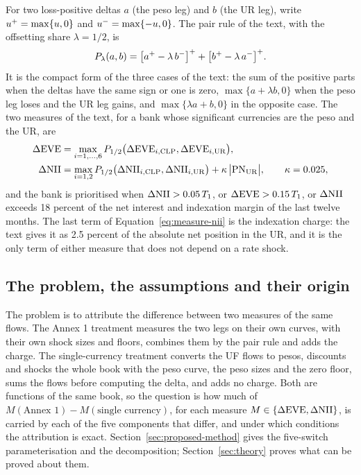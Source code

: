 For two loss-positive deltas $a$ (the peso leg) and $b$ (the UR leg), write ${u}^{+}=\max\{u,0\}$ and ${u}^{-}=\max\{-u,0\}$. The pair rule of the text, with the offsetting share $\lambda=1/2$, is
\begin{equation}
P_\lambda(a,b)=\bigl[{a}^{+}-\lambda\,{b}^{-}\bigr]^{+}+\bigl[{b}^{+}-\lambda\,{a}^{-}\bigr]^{+}.
\label{eq:pair}
\end{equation}
It is the compact form of the three cases of the text: the sum of the positive parts when the deltas have the same sign or one is zero, $\max\{a+\lambda b,0\}$ when the peso leg loses and the UR leg gains, and $\max\{\lambda a+b,0\}$ in the opposite case. The two measures of the text, for a bank whose significant currencies are the peso and the UR, are
\begin{align}
\Delta\mathrm{EVE}&=\max_{i=1,\dots,6}P_{1/2}\bigl(\Delta\mathrm{EVE}_{i,\mathrm{CLP}},\Delta\mathrm{EVE}_{i,\mathrm{UR}}\bigr),\label{eq:measure-eve}\\
\Delta\mathrm{NII}&=\max_{i=1,2}P_{1/2}\bigl(\Delta\mathrm{NII}_{i,\mathrm{CLP}},\Delta\mathrm{NII}_{i,\mathrm{UR}}\bigr)+\kappa\,\bigl|\mathrm{PN}_{\mathrm{UR}}\bigr|,\qquad \kappa=0.025,\label{eq:measure-nii}
\end{align}
and the bank is prioritised when $\Delta\mathrm{NII}>0.05\,T_1$, or $\Delta\mathrm{EVE}>0.15\,T_1$, or $\Delta\mathrm{NII}$ exceeds 18 percent of the net interest and indexation margin of the last twelve months. The last term of Equation~\eqref{eq:measure-nii} is the indexation charge: the text gives it as 2.5 percent of the absolute net position in the UR, and it is the only term of either measure that does not depend on a rate shock.

\subsection{The problem, the assumptions and their origin}
\label{sec:problem-statement}

The problem is to attribute the difference between two measures of the same flows. The Annex 1 treatment measures the two legs on their own curves, with their own shock sizes and floors, combines them by the pair rule and adds the charge. The single-currency treatment converts the UF flows to pesos, discounts and shocks the whole book with the peso curve, the peso sizes and the zero floor, sums the flows before computing the delta, and adds no charge. Both are functions of the same book, so the question is how much of $M(\text{Annex 1})-M(\text{single currency})$, for each measure $M\in\{\Delta\mathrm{EVE},\Delta\mathrm{NII}\}$, is carried by each of the five components that differ, and under which conditions the attribution is exact. Section~\ref{sec:proposed-method} gives the five-switch parameterisation and the decomposition; Section~\ref{sec:theory} proves what can be proved about them.

